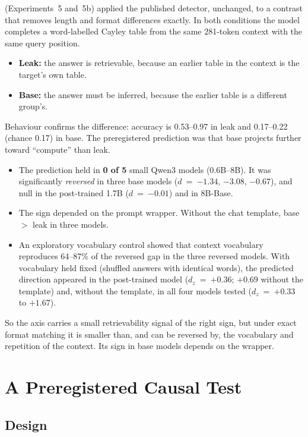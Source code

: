 \documentclass[11pt]{article}
\begin{document}
\citet{ramdan2026fingerprint} (Experiments~5 and~5b) applied the published detector, unchanged, to a contrast that removes length and format differences exactly. In both conditions the model completes a word-labelled Cayley table from the same 281-token context with the same query position.
\begin{itemize}
  \item \textbf{Leak:} the answer is retrievable, because an earlier table in the context is the target's own table.
  \item \textbf{Base:} the answer must be inferred, because the earlier table is a different group's.
\end{itemize}
Behaviour confirms the difference: accuracy is 0.53--0.97 in leak and 0.17--0.22 (chance 0.17) in base. The preregistered prediction was that base projects further toward ``compute'' than leak.
\begin{itemize}
  \item The prediction held in \textbf{0 of 5} small Qwen3 models (0.6B--8B). It was significantly \emph{reversed} in three base models ($d$~=~$-1.34$, $-3.08$, $-0.67$), and null in the post-trained 1.7B ($d$~=~$-0.01$) and in 8B-Base.
  \item The sign depended on the prompt wrapper. Without the chat template, base $>$ leak in three models.
  \item An exploratory vocabulary control showed that context vocabulary reproduces 64--87\% of the reversed gap in the three reversed models. With vocabulary held fixed (shuffled answers with identical words), the predicted direction appeared in the post-trained model ($d_z$~=~$+0.36$; $+0.69$ without the template) and, without the template, in all four models tested ($d_z$~=~$+0.33$ to $+1.67$).
\end{itemize}
So the axis carries a small retrievability signal of the right sign, but under exact format matching it is smaller than, and can be reversed by, the vocabulary and repetition of the context. Its sign in base models depends on the wrapper.

\section{A Preregistered Causal Test}\label{sec:causal}

\subsection{Design}
\end{document}
